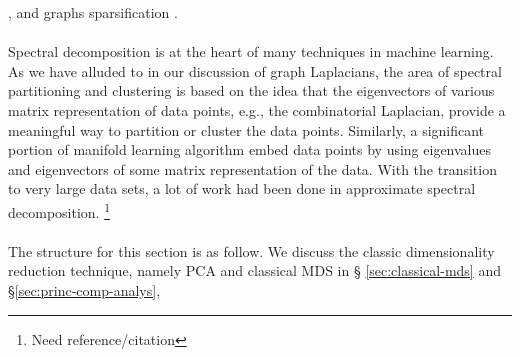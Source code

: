\citep{szummer01:_partial_markov,zhou04:_learn,zhou04:_learn_label_unlab,zhu03:_semi_super_learn_using_gauss},
and graphs sparsification
\citep{spielmand08:_graph}. \\ \\
%
\noindent
Spectral decomposition is at the heart of many techniques in machine
learning. As we have alluded to in our discussion of graph Laplacians,
the area of spectral partitioning and clustering is based on the idea
that the eigenvectors of various matrix representation of data points,
e.g., the combinatorial Laplacian, provide a meaningful way to
partition or cluster the data points. Similarly, a significant portion
of manifold learning algorithm embed data points by using eigenvalues
and eigenvectors of some matrix representation of the data. With the
transition to very large data sets, a lot of work had been done in
approximate spectral decomposition. \footnote{Need reference/citation}
\\ \\
%
%
The structure for this section is as follow. We discuss the classic
dimensionality reduction technique, namely PCA and classical MDS in \S
\ref{sec:classical-mds} and \S \ref{sec:princ-comp-analys},
